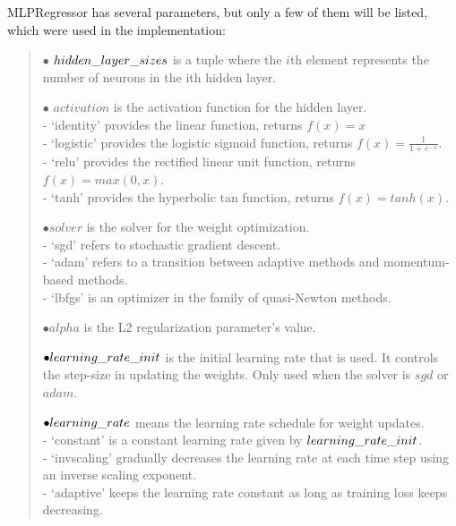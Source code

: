 \noindent MLPRegressor has several parameters, but only a few of them will be listed, which were used in the implementation:
\begin{verse}
	$\bullet$ $hidden\char`_layer\char`_sizes$ is a tuple where the $i$th element represents the number of neurons in the ith hidden layer.
	
	$\bullet$ $activation$ is the activation function for the hidden layer.\\
	\hspace{10pt} - ‘identity’ provides the linear function, returns $f(x) = x$\\
	\hspace{10pt} - ‘logistic’ provides the logistic sigmoid function, returns $f(x) = \frac{1}{1 + e^{-x}}.$\\
	\hspace{10pt} - ‘relu’ provides the rectified linear unit function, returns $f(x) = max(0, x)$. \\
	\hspace{10pt} - ‘tanh’ provides the hyperbolic tan function, returns $f(x) = tanh(x)$.
	
	$\bullet solver$ is the solver for the weight optimization.\\
	\hspace{10pt} - ‘sgd’ refers to stochastic gradient descent.\\
	\hspace{10pt} - ‘adam’ refers to a transition between adaptive methods and momentum-based methods.\\
	\hspace{10pt} - ‘lbfgs’ is an optimizer in the family of quasi-Newton methods.
	
	$\bullet alpha$ is the L2 regularization parameter's value.
	
	$\bullet learning\char`_rate\char`_init$ is the initial learning rate that is used. It controls the step-size in updating the weights. Only used when the solver is $sgd$ or $adam$.
	
	$\bullet learning\char`_rate$ means the learning rate schedule for weight updates. \\
	\hspace{10pt} - ‘constant’ is a constant learning rate given by $learning\char`_rate\char`_init$.\\
	\hspace{10pt} - ‘invscaling’ gradually decreases the learning rate at each time step using an inverse scaling exponent.\\
	\hspace{10pt} - ‘adaptive’ keeps the learning rate constant as long as training loss keeps decreasing.
\end{verse}
